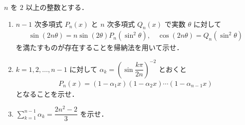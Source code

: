 \documentclass[../../main.tex]{subfiles}
\begin{document}
$n$ を $2$ 以上の整数とする．

\begin{enumerate}
  \item $n-1$ 次多項式 $P_n(x)$ と $n$ 次多項式 $Q_n(x)$ で実数 $\theta$ に対して
    \begin{align}
      \sin(2n\theta) = n \sin(2\theta) P_n(\sin^2\theta), \quad \cos(2n\theta) = Q_n(\sin^2\theta)
    \end{align}
    を満たすものが存在することを帰納法を用いて示せ．
  \item $k=1, 2, \dots, n-1$ に対して $\alpha_k = \left(\sin\dfrac{k\pi}{2n}\right)^{-2}$ とおくと
    \begin{align}
      P_n(x) = (1-\alpha_1 x)(1-\alpha_2 x)\cdots(1-\alpha_{n-1} x)
    \end{align}
    となることを示せ．
  \item $\sum_{k=1}^{n-1} \alpha_k = \dfrac{2n^2-2}{3}$ を示せ．
\end{enumerate}
\end{document}
